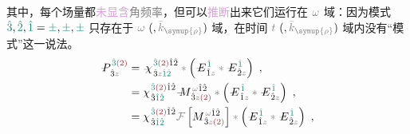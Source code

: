 其中，每个场量都\textcolor{Plum}{未显含}\textcolor{gray}{角频率}，但可以\textcolor{Plum}{推断}出来它们运行在 $\mathcolor{gray}{\omega}$ 域：因为\textcolor{PineGreen}{模式} $\textcolor{PineGreen}{\hat{3}},\textcolor{PineGreen}{\hat{2}},\textcolor{PineGreen}{\hat{1}} = \textcolor{PineGreen}{\pm},\textcolor{PineGreen}{\pm},\textcolor{PineGreen}{\pm}$ 只存在于 $\mathcolor{gray}{\omega}~ (, \mathcolor{gray}{\bar{k}_{\symup{\rho}}})$ 域，在时间 $\mathcolor{gray}{t}~ (, \mathcolor{gray}{\bar{k}_{\symup{\rho}}})$ 域内没有“\textcolor{PineGreen}{模式}”这一说法。
\begin{subequations} \label{eq:DP^(2)-plane_wave_basis-3_12-C}
\begin{align}
	\Xint{\mathcolor{gray}{-}}{30}{P}^{\;\! \textcolor{PineGreen}{\hat{3}} \textcolor{Maroon}{(2)} }_{\;\! \hat{3}\mathcolor{gray}{z}} &= \Xint{{}^{}_{\mathcolor{gray}{-}}}{23}{\chi}^{\;\! \textcolor{PineGreen}{\hat{3}} \textcolor{Maroon}{(2)} \hat{1} \hat{2} }_{\;\! \hat{3} \mathcolor{gray}{z} \textcolor{PineGreen}{\hat{1} \hat{2}}} \mathcolor{gray}{*} \left( \Xint{\mathcolor{gray}{-}}{295}{E}^{\;\!\textcolor{PineGreen}{\hat{1}}}_{\;\! \hat{1} \mathcolor{gray}{z}} \mathcolor{gray}{*} \Xint{\mathcolor{gray}{-}}{295}{E}^{\;\!\textcolor{PineGreen}{\hat{1}}}_{\;\! \hat{2} \mathcolor{gray}{z}} \right) ~, \label{eq:DP^(2)-3_12-C1} \\
	&= {\chi}^{\;\! \textcolor{PineGreen}{\hat{3}} \textcolor{Maroon}{(2)} \hat{1} \hat{2} }_{\;\! \hat{3} \textcolor{PineGreen}{\hat{1} \hat{2}}} \Xint{\mathcolor{gray}{-}}{18}{M}^{\;\! \mathcolor{gray}{\omega} \hat{1} \hat{2} }_{\;\! \hat{3} \mathcolor{gray}{z} \textcolor{Maroon}{(2)} } \mathcolor{gray}{*} \left( \Xint{\mathcolor{gray}{-}}{295}{E}^{\;\!\textcolor{PineGreen}{\hat{1}}}_{\;\! \hat{1} \mathcolor{gray}{z}} \mathcolor{gray}{*} \Xint{\mathcolor{gray}{-}}{295}{E}^{\;\!\textcolor{PineGreen}{\hat{1}}}_{\;\! \hat{2} \mathcolor{gray}{z}} \right) ~, \label{eq:DP^(2)-3_12-C2} \\
	&= {\chi}^{\;\! \textcolor{PineGreen}{\hat{3}} \textcolor{Maroon}{(2)} \hat{1} \hat{2} }_{\;\! \hat{3} \textcolor{PineGreen}{\hat{1} \hat{2}}} \mathcolor{gray}{\mathcal F} \left[ M^{\;\! \mathcolor{gray}{\omega} \hat{1} \hat{2} }_{\;\! \hat{3} \mathcolor{gray}{z} \textcolor{Maroon}{(2)} } \right] \mathcolor{gray}{*} \left( \Xint{\mathcolor{gray}{-}}{295}{E}^{\;\!\textcolor{PineGreen}{\hat{1}}}_{\;\! \hat{1} \mathcolor{gray}{z}} \mathcolor{gray}{*} \Xint{\mathcolor{gray}{-}}{295}{E}^{\;\!\textcolor{PineGreen}{\hat{1}}}_{\;\! \hat{2} \mathcolor{gray}{z}} \right) ~, \label{eq:DP^(2)-3_12-C3} \\

\end{align}
\end{subequations}
